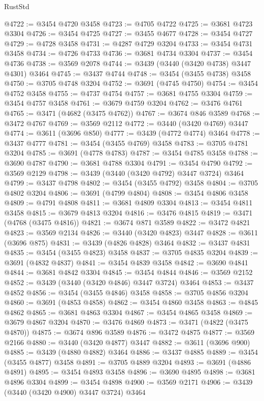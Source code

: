 \begin{lexlean}{RustStd}
\begin{coremodule}
{{{{{{{{{{{{{{{{{{{@4722 := @3454 @4720 @3458
@4723 := @4705 @4722
@4725 := @3681 @4723 @3304
@4726 := @3454 @4725
@4727 := @3455 @4677
@4728 := @3454 @4727
@4729 := @4728 @3458
@4731 := @4287 @4729 @3204
@4733 := @3454 @4731 @3458
@4734 := @4726 @4733
@4736 := @3681 @4734 @3304
@4737 := @3454 @4736
@4738 := @3569 @2078
@4744 := @3439 (@3440 (@3420 @4738) @3447 @4301) @3464
@4745 := @3437 @4744
@4748 := @3454 (@3455 @4738) @3458
@4750 := @3705 @4748 @3204
@4752 := @3691 (@4745 @4750)
@4754 := @3454 @4752 @3458
@4755 := @4737 @4754
@4757 := @3681 @4755 @3304
@4759 := @3454 @4757 @3458
@4761 := @3679 @4759 @3204
@4762 := @3476 @4761
@4765 := @3471 (@4682 (@3475 @4762))
@4767 := @3674 @846 @3589
@4768 := @3472 @4767
@4769 := @3569 @2112
@4772 := @3440 (@3420 @4769) @3447
@4774 := @3611 (@3696 @850)
@4777 := @3439 (@4772 @4774) @3464
@4778 := @3437 @4777
@4781 := @3454 (@3455 @4769) @3458
@4783 := @3705 @4781 @3204
@4785 := @3691 (@4778 @4783)
@4787 := @3454 @4785 @3458
@4788 := @3690 @4787
@4790 := @3681 @4788 @3304
@4791 := @3454 @4790
@4792 := @3569 @2129
@4798 := @3439 (@3440 (@3420 @4792) @3447 @3724) @3464
@4799 := @3437 @4798
@4802 := @3454 (@3455 @4792) @3458
@4804 := @3705 @4802 @3204
@4806 := @3691 (@4799 @4804)
@4808 := @3454 @4806 @3458
@4809 := @4791 @4808
@4811 := @3681 @4809 @3304
@4813 := @3454 @4811 @3458
@4815 := @3679 @4813 @3204
@4816 := @3476 @4815
@4819 := @3471 (@4768 (@3475 @4816))
@4821 := @3674 @871 @3589
@4822 := @3472 @4821
@4823 := @3569 @2134
@4826 := @3440 (@3420 @4823) @3447
@4828 := @3611 (@3696 @875)
@4831 := @3439 (@4826 @4828) @3464
@4832 := @3437 @4831
@4835 := @3454 (@3455 @4823) @3458
@4837 := @3705 @4835 @3204
@4839 := @3691 (@4832 @4837)
@4841 := @3454 @4839 @3458
@4842 := @3690 @4841
@4844 := @3681 @4842 @3304
@4845 := @3454 @4844
@4846 := @3569 @2152
@4852 := @3439 (@3440 (@3420 @4846) @3447 @3724) @3464
@4853 := @3437 @4852
@4856 := @3454 (@3455 @4846) @3458
@4858 := @3705 @4856 @3204
@4860 := @3691 (@4853 @4858)
@4862 := @3454 @4860 @3458
@4863 := @4845 @4862
@4865 := @3681 @4863 @3304
@4867 := @3454 @4865 @3458
@4869 := @3679 @4867 @3204
@4870 := @3476 @4869
@4873 := @3471 (@4822 (@3475 @4870))
@4875 := @3674 @896 @3589
@4876 := @3472 @4875
@4877 := @3569 @2166
@4880 := @3440 (@3420 @4877) @3447
@4882 := @3611 (@3696 @900)
@4885 := @3439 (@4880 @4882) @3464
@4886 := @3437 @4885
@4889 := @3454 (@3455 @4877) @3458
@4891 := @3705 @4889 @3204
@4893 := @3691 (@4886 @4891)
@4895 := @3454 @4893 @3458
@4896 := @3690 @4895
@4898 := @3681 @4896 @3304
@4899 := @3454 @4898
@4900 := @3569 @2171
@4906 := @3439 (@3440 (@3420 @4900) @3447 @3724) @3464
}}}}}}}}}}}}}}}}}}}
\end{coremodule}
\end{lexlean}

